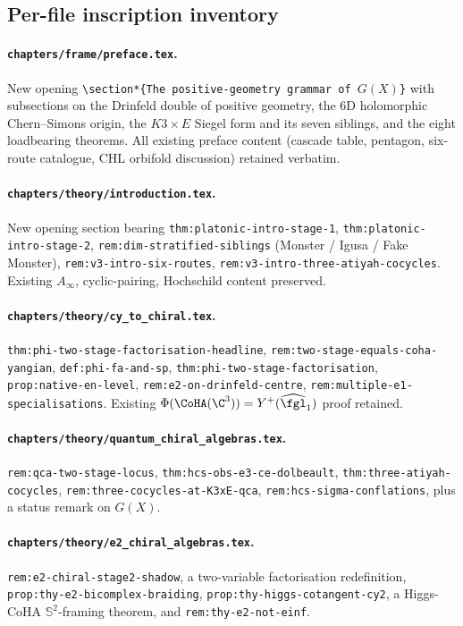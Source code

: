 \subsection*{Per-file inscription inventory}

\paragraph{\texttt{chapters/frame/preface.tex}.} New opening
\texttt{\textbackslash section*\{The positive-geometry grammar of $G(X)$\}}
with subsections on the Drinfeld double of positive geometry, the
6D holomorphic Chern--Simons origin, the $K3 \times E$ Siegel form
and its seven siblings, and the eight loadbearing theorems. All
existing preface content (cascade table, pentagon, six-route
catalogue, CHL orbifold discussion) retained verbatim.

\paragraph{\texttt{chapters/theory/introduction.tex}.} New opening
section bearing \texttt{thm:platonic-intro-stage-1},
\texttt{thm:platonic-intro-stage-2}, \texttt{rem:dim-stratified-siblings}
(Monster / Igusa / Fake Monster), \texttt{rem:v3-intro-six-routes},
\texttt{rem:v3-intro-three-atiyah-cocycles}. Existing $A_\infty$,
cyclic-pairing, Hochschild content preserved.

\paragraph{\texttt{chapters/theory/cy\_to\_chiral.tex}.}
\texttt{thm:phi-two-stage-factorisation-headline},
\texttt{rem:two-stage-equals-coha-yangian},
\texttt{def:phi-fa-and-sp}, \texttt{thm:phi-two-stage-factorisation},
\texttt{prop:native-en-level}, \texttt{rem:e2-on-drinfeld-centre},
\texttt{rem:multiple-e1-specialisations}. Existing
$\Phi(\CoHA(\C^3)) = Y^+(\widehat{\fgl}_1)$ proof retained.

\paragraph{\texttt{chapters/theory/quantum\_chiral\_algebras.tex}.}
\texttt{rem:qca-two-stage-locus},
\texttt{thm:hcs-obs-e3-ce-dolbeault},
\texttt{thm:three-atiyah-cocycles},
\texttt{rem:three-cocycles-at-K3xE-qca},
\texttt{rem:hcs-sigma-conflations}, plus a status remark on $G(X)$.

\paragraph{\texttt{chapters/theory/e2\_chiral\_algebras.tex}.}
\texttt{rem:e2-chiral-stage2-shadow}, a two-variable factorisation
redefinition, \texttt{prop:thy-e2-bicomplex-braiding},
\texttt{prop:thy-higgs-cotangent-cy2}, a Higgs-CoHA
$\mathbb{S}^2$-framing theorem, and \texttt{rem:thy-e2-not-einf}.

